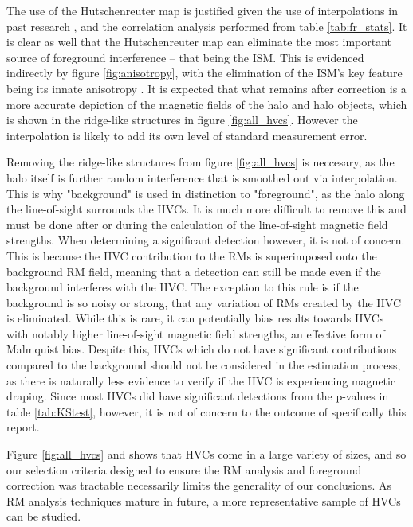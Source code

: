 The use of the Hutschenreuter map is justified given the use of interpolations in past research \citep{ID3, ID5, ID6, ID26, ID73}, and the correlation analysis performed from table \ref{tab:fr_stats}. It is clear as well that the Hutschenreuter map can eliminate the most important source of foreground interference – that being the ISM. This is evidenced indirectly by figure \ref{fig:anisotropy}, with the elimination of the ISM's key feature being its innate anisotropy \citep{ID30}. It is expected that what remains after correction is a more accurate depiction of the magnetic fields of the halo and halo objects, which is shown in the ridge-like structures in figure \ref{fig:all_hvcs}. However the interpolation is likely to add its own level of standard measurement error.


Removing the ridge-like structures from figure \ref{fig:all_hvcs} is neccesary, as the halo itself is further random interference that is smoothed out via interpolation. This is why "background" is used in distinction to "foreground", as the halo along the line-of-sight surrounds the HVCs. It is much more difficult to remove this and must be done after or during the calculation of the line-of-sight magnetic field strengths. When determining a significant detection however, it is not of concern. This is because the HVC contribution to the RMs is superimposed onto the background RM field, meaning that a detection can still be made even if the background interferes with the HVC. The exception to this rule is if the background is so noisy or strong, that any variation of RMs created by the HVC is eliminated. While this is rare, it can potentially bias results towards HVCs with notably higher line-of-sight magnetic field strengths, an effective form of Malmquist bias. Despite this, HVCs which do not have significant contributions compared to the background should not be considered in the estimation process, as there is naturally less evidence to verify if the HVC is experiencing magnetic draping. Since most HVCs did have significant detections from the p-values in table \ref{tab:KStest}, however, it is not of concern to the outcome of specifically this report.


Figure \ref{fig:all_hvcs} and \cite{ID3} shows that HVCs come in a large variety of sizes, and so our selection criteria designed to ensure the RM analysis and foreground correction was tractable necessarily limits the generality of our conclusions. As RM analysis techniques mature in future, a more representative sample of HVCs can be studied.


